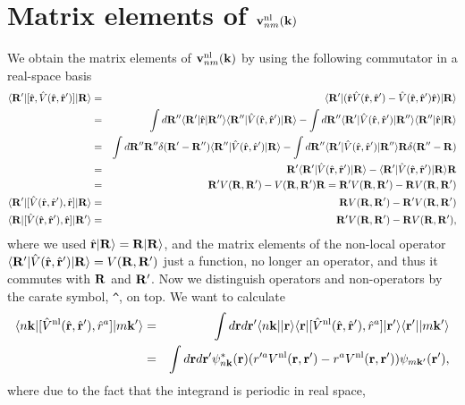 \section{Matrix elements of \texorpdfstring{$\bfv^\nl_{nm}(\bfk)$}{Vnonlocal}}\label{appvnl}
We obtain the matrix elements of $\bfv^\nl_{nm}(\bfk)$ by using
the following commutator in a
real-space basis
\begin{eqnarray}\label{cn0}
\bra{\bfR'}[\hat\bfr,\hat V(\hat\bfr,\hat\bfr')]\ket{\bfR}
&=&
\bra{\bfR'}(\hat\bfr\hat V(\hat\bfr,\hat\bfr')
-
\hat V(\hat\bfr,\hat\bfr')\hat\bfr
)
\ket{\bfR}
\nonumber\\
&=&
\int d\bfR''\bra{\bfR'}\hat\bfr\ket{\bfR''}\bra{\bfR''}\hat V(\hat\bfr,\hat\bfr') \ket{\bfR}
-
\int d\bfR''\bra{\bfR'}\hat V(\hat\bfr,\hat\bfr')\ket{\bfR''}\bra{\bfR''}\hat\bfr\ket{\bfR}
\nonumber\\
&=&
\int d\bfR'' \bfR''\gd(\bfR'-\bfR'')
\bra{\bfR''}\hat V(\hat\bfr,\hat\bfr') \ket{\bfR}
-
\int d\bfR''\bra{\bfR'}\hat V(\hat\bfr,\hat\bfr')\ket{\bfR''}\bfR\gd(\bfR''-\bfR)
\nonumber\\
&=&
\bfR'\bra{\bfR'}\hat V(\hat\bfr,\hat\bfr') \ket{\bfR}
-
\bra{\bfR'}\hat V(\hat\bfr,\hat\bfr')\ket{\bfR}\bfR
\nonumber\\
&=&
\bfR'
V(\bfR,\bfR')
-
V(\bfR,\bfR')
\bfR
=
\bfR'
V(\bfR,\bfR')
-
\bfR
 V(\bfR,\bfR')
\nonumber\\
\bra{\bfR'}[\hat V(\hat\bfr,\hat\bfr'),\hat\bfr]\ket{\bfR}
&=&
\bfR
V(\bfR,\bfR')
-
\bfR'
 V(\bfR,\bfR')
\nonumber\\
\bra{\bfR}[\hat V(\hat\bfr,\hat\bfr'),\hat\bfr]\ket{\bfR'}
&=&
\bfR'
V(\bfR,\bfR')
-
\bfR
 V(\bfR,\bfR')
,
\end{eqnarray} 
where we used $\hat\bfr\ket{\bfR}=\bfR\ket{\bfR}$, and
the matrix elements of the non-local operator
$\bra{\bfR'}\hat V(\hat\bfr,\hat\bfr')\ket{\bfR}=V(\bfR,\bfR')$ just a
function, no longer an operator, and thus it commutes with $\bfR$ and $\bfR'$.
Now we distinguish operators and non-operators by the carate symbol,
\verb=^=, on top.
We want to calculate
\begin{eqnarray}\label{cn2}
\bra{n\bfk}[\hat V^\nl(\hat\bfr,\hat\bfr'),\hat r^a]\ket{m\bfk'}
&=&
\int d\bfr d\bfr'
\bra{n\bfk}
\ket{\bfr}\bra{\bfr}
[\hat V^\nl(\hat\bfr,\hat\bfr'),\hat r^a]
\ket{\bfr'}\bra{\bfr'}
\ket{m\bfk'}
\nonumber\\
&=&
\int d\bfr d\bfr'
\psi^*_{n\bfk}(\bfr)
(  
r'^a V^\nl(\bfr,\bfr')
-  
r^aV^\nl(\bfr,\bfr')
)
\psi_{m\bfk'}(\bfr')
,
\end{eqnarray}  
where due to the fact that the integrand is periodic in real space,
